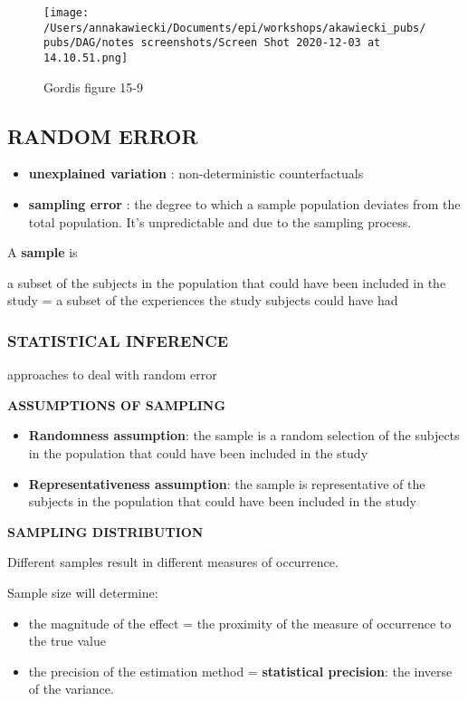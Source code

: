 \documentclass[
]{article}
\begin{document}
\begin{figure}
\centering
\texttt{[image: /Users/annakawiecki/Documents/epi/workshops/akawiecki\_pubs/pubs/DAG/notes screenshots/Screen Shot 2020-12-03 at 14.10.51.png]}
\caption{Gordis figure 15-9}
\end{figure}

\hypertarget{random-error}{%
\subsection{RANDOM ERROR}\label{random-error}}

\begin{itemize}
\item
  \textbf{unexplained variation} : non-deterministic counterfactuals
\item
  \textbf{sampling error} : the degree to which a sample population
  deviates from the total population. It's unpredictable and due to the
  sampling process.
\end{itemize}

A \textbf{sample} is

a subset of the subjects in the population that could have been included
in the study = a subset of the experiences the study subjects could have
had

\hypertarget{statistical-inference}{%
\subsubsection{STATISTICAL INFERENCE}\label{statistical-inference}}

approaches to deal with random error

\textbf{ASSUMPTIONS OF SAMPLING}

\begin{itemize}
\item
  \textbf{Randomness assumption}: the sample is a random selection of
  the subjects in the population that could have been included in the
  study
\item
  \textbf{Representativeness assumption}: the sample is representative
  of the subjects in the population that could have been included in the
  study
\end{itemize}

\textbf{SAMPLING DISTRIBUTION}

Different samples result in different measures of occurrence.

Sample size will determine:

\begin{itemize}
\item
  the magnitude of the effect = the proximity of the measure of
  occurrence to the true value
\item
  the precision of the estimation method = \textbf{statistical
  precision}: the inverse of the variance.
\end{itemize}
\end{document}
